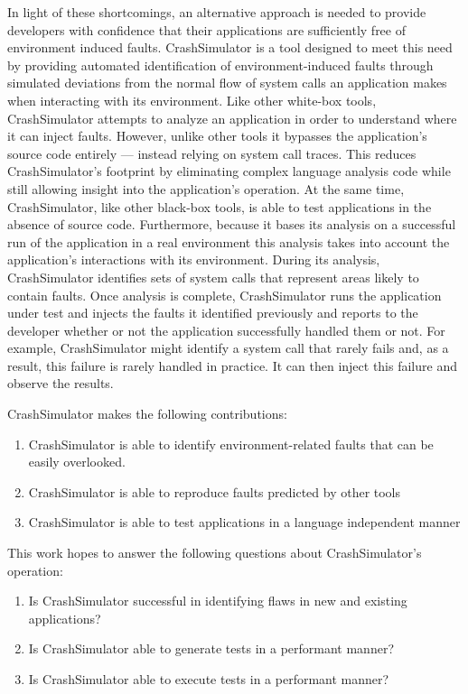     In light of these shortcomings, an alternative approach is needed to provide developers with confidence that their
    applications are sufficiently free of environment induced faults.  CrashSimulator is a tool designed to meet this
    need by providing automated identification of environment-induced faults through simulated deviations from the
    normal flow of system calls an application makes when interacting with its environment. Like other white-box tools,
    CrashSimulator attempts to analyze an application in order to understand where it can inject faults.  However,
    unlike other tools it bypasses the application's source code entirely --- instead relying on system call traces.
    This reduces CrashSimulator's footprint by eliminating complex language analysis code while still allowing insight
    into the application's operation. At the same time, CrashSimulator, like other black-box tools, is able to test
    applications in the absence of source code. Furthermore, because it bases its analysis on a successful run of the
    application in a real environment this analysis takes into account the application's interactions with its
    environment. During its analysis, CrashSimulator identifies sets of system calls that represent areas likely to
    contain faults. Once analysis is complete, CrashSimulator runs the application under test and injects the faults it
    identified previously and reports to the developer whether or not the application successfully handled them or not.
    For example, CrashSimulator might identify a system call that rarely fails and, as a result, this failure is rarely
    handled in practice. It can then inject this failure and observe the results.

    CrashSimulator makes the following contributions:

    \begin{enumerate}
        \item{CrashSimulator is able to identify environment-related faults that can be easily overlooked.}
        \item{CrashSimulator is able to reproduce faults predicted by other tools}
        \item{CrashSimulator is able to test applications in a language independent manner}
    \end{enumerate}

    This work hopes to answer the following questions about CrashSimulator's operation:

    \begin{enumerate}
        \item{Is CrashSimulator successful in identifying flaws in new and existing applications?}
        \item{Is CrashSimulator able to generate tests in a performant manner?}
        \item{Is CrashSimulator able to execute tests in a performant manner?}
    \end{enumerate}
